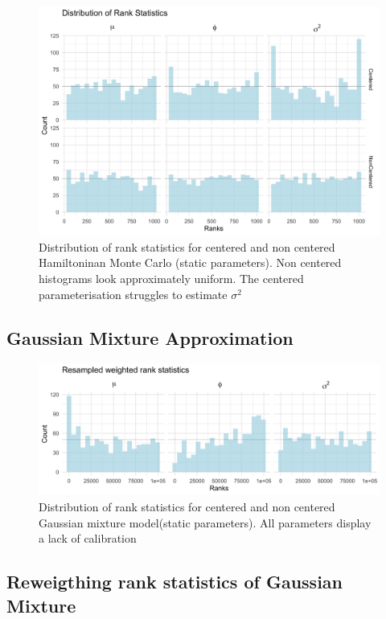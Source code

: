 \documentclass[12pt, a4paper]{article}
\begin{document}
    \begin{figure}[H]
        \centering
        \includegraphics[scale=0.1]{results/hmc_1k.png}
        \caption{Distribution of rank statistics for centered and non centered Hamiltoninan Monte Carlo (static parameters). Non centered histograms look approximately uniform. The centered parameterisation struggles to estimate $\sigma^2$}
    \end{figure}


    \subsection{Gaussian Mixture Approximation}

    \begin{figure}[H]
        \centering
        \includegraphics[scale=0.1]{results/ksc_1k.png}
        \caption{Distribution of rank statistics for centered and non centered Gaussian mixture model(static parameters). All parameters display a lack of calibration}
    \end{figure}

    \subsection{Reweigthing rank statistics of Gaussian Mixture}
\end{document}
